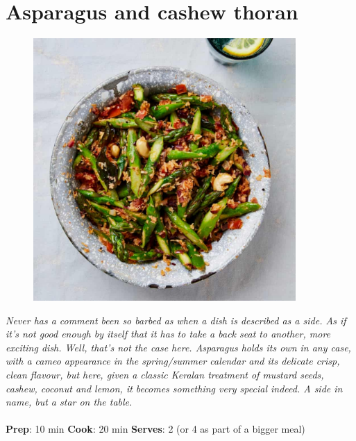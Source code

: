\documentclass{book}
\begin{document}
\section{Asparagus and cashew thoran}
\begin{figure}
\centering\includegraphics[width=10cm,height=10cm,keepaspectratio]{Recipe_Pictures/Asparagus_and_cashew_thoran.png}
\end{figure}
\emph{Never has a comment been so barbed as when a dish is described as a side. As if it’s not good enough by itself that it has to take a back seat to another, more exciting dish. Well, that’s not the case here. Asparagus holds its own in any case, with a cameo appearance in the spring/summer calendar and its delicate crisp, clean flavour, but here, given a classic Keralan treatment of mustard seeds, cashew, coconut and lemon, it becomes something very special indeed. A side in name, but a star on the table.}\\\\ 
\textbf{Prep}: 10 min
\textbf{Cook}: 20 min
\textbf{Serves}: 2 (or 4 as part of a bigger meal)
\end{document}

